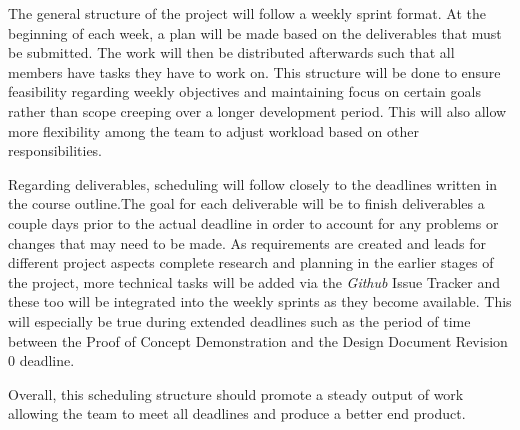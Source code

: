 \documentclass{article}
\begin{document}
The general structure of the project will follow a weekly sprint format. At the beginning
of each week, a plan will be made based on the deliverables that must be submitted. The
work will then be distributed afterwards such that all members have tasks they have
to work on. This structure will be done to ensure feasibility regarding weekly
objectives and maintaining focus on certain goals rather than scope creeping over
a longer development period. This will also allow more flexibility among the team to adjust workload
based on other responsibilities. \par

Regarding deliverables, scheduling will follow closely to the deadlines written in the
course outline.The goal for each deliverable will be to finish deliverables a couple days
prior to the actual deadline in order to account for any problems or changes that may
need to be made. As requirements are created and leads for different project aspects complete
research and planning in the earlier stages of the project, more technical tasks will be added
via the \emph{Github} Issue Tracker and these too will be integrated into the weekly sprints as
they become available. This will especially be true during extended deadlines such as the period
of time between the Proof of Concept Demonstration and the Design Document Revision 0 deadline. \par

Overall, this scheduling structure should promote a steady output of work allowing the team
to meet all deadlines and produce a better end product.
\end{document}
